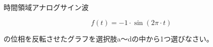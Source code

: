 時間領域アナログサイン波

\[
f(t) = -1 \cdot \sin( 2 \pi \cdot t )
\]

\bigskip
\noindent  の位相を反転させたグラフを選択肢a〜dの中から1つ選びなさい。
